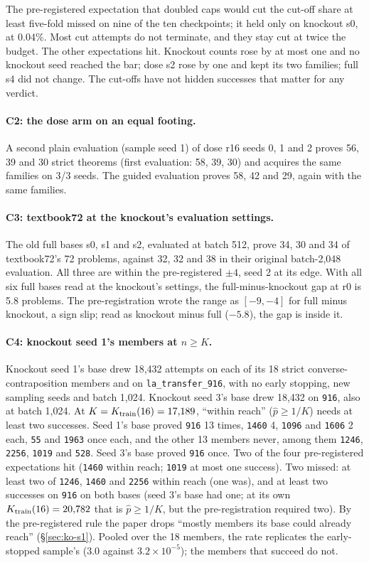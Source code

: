 The pre-registered expectation that doubled caps would cut the cut-off share at least five-fold missed on nine of the
ten checkpoints; it held only on knockout s0, at 0.04\%. Most cut attempts do not terminate, and they stay cut at twice
the budget. The other expectations hit. Knockout counts rose by at most one and no knockout seed reached the bar; dose
s2 rose by one and kept its two families; full s4 did not change. The cut-offs have not hidden successes that matter
for any verdict.

\paragraph{C2: the dose arm on an equal footing.} A second plain evaluation (sample seed 1) of dose r16 seeds 0, 1 and 2
proves 56, 39 and 30 strict theorems (first evaluation: 58, 39, 30) and acquires the same families on 3/3 seeds. The
guided evaluation proves 58, 42 and 29, again with the same families.

\paragraph{C3: textbook72 at the knockout's evaluation settings.} The old full bases s0, s1 and s2, evaluated at batch 512,
prove 34, 30 and 34 of textbook72's 72 problems, against 32, 32 and 38 in their original batch-2,048 evaluation. All
three are within the pre-registered $\pm4$, seed 2 at its edge. With all six full bases read at the knockout's settings,
the full-minus-knockout gap at r0 is 5.8 problems. The pre-registration wrote the range as $[-9, -4]$ for full minus
knockout, a sign slip; read as knockout minus full ($-5.8$), the gap is inside it.

\paragraph{C4: knockout seed 1's members at $n \geq K$.} Knockout seed 1's base drew 18,432 attempts on each of its 18
strict converse-contraposition members and on \texttt{la\_transfer\_916}, with no early stopping, new sampling seeds and
batch 1,024.
Knockout seed 3's base drew 18,432 on \texttt{916}, also at batch 1,024. At $K = K_{\mathrm{train}}(16) = 17{,}189$, ``within reach'' ($\hat p \geq 1/K$)
needs at least two successes. Seed 1's base proved \texttt{916} 13 times, \texttt{1460} 4, \texttt{1096} and
\texttt{1606} 2 each, \texttt{55} and \texttt{1963} once each, and the other 13 members never, among them
\texttt{1246}, \texttt{2256}, \texttt{1019} and \texttt{528}. Seed 3's base proved \texttt{916} once. Two of the four
pre-registered expectations hit (\texttt{1460} within reach; \texttt{1019} at most one success). Two missed: at least
two of \texttt{1246}, \texttt{1460} and \texttt{2256} within reach (one was), and at least two successes on \texttt{916}
on both bases (seed 3's base had one; at its own $K_{\mathrm{train}}(16) = 20{,}782$ that is $\hat p \geq 1/K$, but the
pre-registration required two). By the pre-registered rule the paper drops ``mostly members its base could already reach''
(\S\ref{sec:ko-s1}). Pooled over the 18 members, the rate replicates the early-stopped sample's ($3.0$ against
$3.2\times10^{-5}$); the members that succeed do not.

